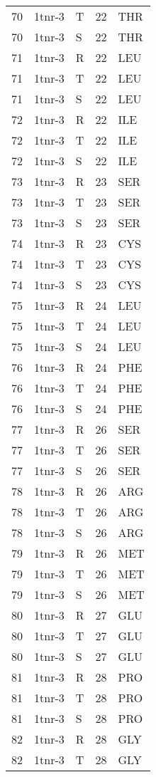 \begin{tiny}
\begin{longtable}[l]{l|l|l|l|l}
	70 & 1tnr-3 & T & 22 & THR \\
	70 & 1tnr-3 & S & 22 & THR \\
	71 & 1tnr-3 & R & 22 & LEU \\
	71 & 1tnr-3 & T & 22 & LEU \\
	71 & 1tnr-3 & S & 22 & LEU \\
	72 & 1tnr-3 & R & 22 & ILE \\
	72 & 1tnr-3 & T & 22 & ILE \\
	72 & 1tnr-3 & S & 22 & ILE \\
	73 & 1tnr-3 & R & 23 & SER \\
	73 & 1tnr-3 & T & 23 & SER \\
	73 & 1tnr-3 & S & 23 & SER \\
	74 & 1tnr-3 & R & 23 & CYS \\
	74 & 1tnr-3 & T & 23 & CYS \\
	74 & 1tnr-3 & S & 23 & CYS \\
	75 & 1tnr-3 & R & 24 & LEU \\
	75 & 1tnr-3 & T & 24 & LEU \\
	75 & 1tnr-3 & S & 24 & LEU \\
	76 & 1tnr-3 & R & 24 & PHE \\
	76 & 1tnr-3 & T & 24 & PHE \\
	76 & 1tnr-3 & S & 24 & PHE \\
	77 & 1tnr-3 & R & 26 & SER \\
	77 & 1tnr-3 & T & 26 & SER \\
	77 & 1tnr-3 & S & 26 & SER \\
	78 & 1tnr-3 & R & 26 & ARG \\
	78 & 1tnr-3 & T & 26 & ARG \\
	78 & 1tnr-3 & S & 26 & ARG \\
	79 & 1tnr-3 & R & 26 & MET \\
	79 & 1tnr-3 & T & 26 & MET \\
	79 & 1tnr-3 & S & 26 & MET \\
	80 & 1tnr-3 & R & 27 & GLU \\
	80 & 1tnr-3 & T & 27 & GLU \\
	80 & 1tnr-3 & S & 27 & GLU \\
	81 & 1tnr-3 & R & 28 & PRO \\
	81 & 1tnr-3 & T & 28 & PRO \\
	81 & 1tnr-3 & S & 28 & PRO \\
	82 & 1tnr-3 & R & 28 & GLY \\
	82 & 1tnr-3 & T & 28 & GLY \\

\end{longtable}
\end{tiny}

